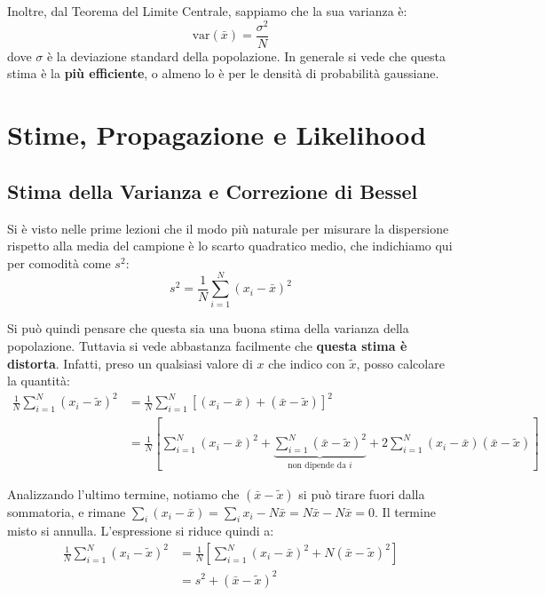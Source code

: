 \documentclass[openany,a4paper,12pt]{book}
\theoremstyle{remark}
\begin{document}
Inoltre, dal Teorema del Limite Centrale, sappiamo che la sua varianza è:
\begin{equation*}
\text{var}(\bar{x}) = \frac{\sigma^2}{N}
\end{equation*}
dove $\sigma$ è la deviazione standard della popolazione.
In generale si vede che questa stima è la \textbf{più efficiente}, o almeno lo è per le densità di probabilità gaussiane.


\section{Stime, Propagazione e Likelihood}

\subsection*{Stima della Varianza e Correzione di Bessel}

Si è visto nelle prime lezioni che il modo più naturale per misurare la dispersione rispetto alla media del campione è lo scarto quadratico medio, che indichiamo qui per comodità come $s^2$:
\begin{equation}
s^2 = \frac{1}{N} \sum_{i=1}^N (x_i - \bar{x})^2
\end{equation}

Si può quindi pensare che questa sia una buona stima della varianza della popolazione. Tuttavia si vede abbastanza facilmente che \textbf{questa stima è distorta}. Infatti, preso un qualsiasi valore di $x$ che indico con $\tilde{x}$, posso calcolare la quantità:
\begin{align*}
\frac{1}{N} \sum_{i=1}^N (x_i - \tilde{x})^2 &= \frac{1}{N} \sum_{i=1}^N \left[ (x_i - \bar{x}) + (\bar{x} - \tilde{x}) \right]^2 \\
&= \frac{1}{N} \left[ \sum_{i=1}^N (x_i - \bar{x})^2 + \underbrace{\sum_{i=1}^N (\bar{x} - \tilde{x})^2}_{\text{non dipende da } i} + 2 \sum_{i=1}^N (x_i - \bar{x})(\bar{x} - \tilde{x}) \right]
\end{align*}

Analizzando l'ultimo termine, notiamo che $(\bar{x} - \tilde{x})$ si può tirare fuori dalla sommatoria, e rimane $\sum_{i} (x_i - \bar{x}) = \sum_{i} x_i - N\bar{x} = N\bar{x} - N\bar{x} = 0$. Il termine misto si annulla. L'espressione si riduce quindi a:
\begin{align*}
\frac{1}{N} \sum_{i=1}^N (x_i - \tilde{x})^2 &= \frac{1}{N} \left[ \sum_{i=1}^N (x_i - \bar{x})^2 + N(\bar{x} - \tilde{x})^2 \right] \\
&= s^2 + (\bar{x} - \tilde{x})^2
\end{align*}
\end{document}
